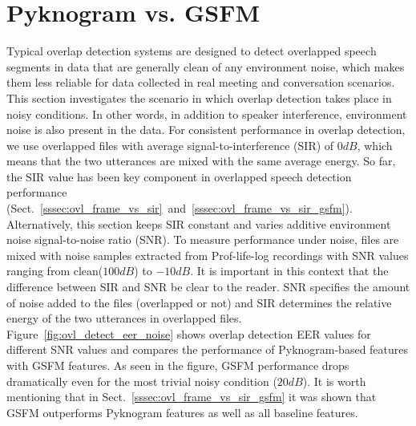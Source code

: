 {\section{Pyknogram vs. GSFM}
\label{sec:ch2_Pykno_vs_GSFM}
Typical overlap detection systems are designed to detect overlapped speech segments in data that are generally clean of any environment noise, which makes them less reliable for data collected in real meeting and conversation scenarios. 
This section investigates the scenario in which overlap detection takes place in noisy conditions. 
In other words, in addition to speaker interference, environment noise is also present in the data. 
For consistent performance in overlap detection, we use overlapped files with average signal-to-interference (SIR) of $0dB$, which means that the two utterances are mixed with the same average energy. 
So far, the SIR value has been key component in overlapped speech detection performance (Sect.~\ref{sssec:ovl_frame_vs_sir}~and~\ref{sssec:ovl_frame_vs_sir_gsfm}).
Alternatively, this section keeps SIR constant and varies additive environment noise signal-to-noise ratio (SNR).
To measure performance under noise, files are mixed with noise samples extracted from Prof-life-log\cite{ziaei2013prof} recordings with SNR values ranging from clean($100dB$) to $-10dB$. 
It is important in this context that the difference between SIR and SNR be clear to the reader. 
SNR specifies the amount of noise added to the files (overlapped or not) and SIR determines the relative energy of the two utterances in overlapped files. 
Figure~\ref{fig:ovl_detect_eer_noise} shows overlap detection EER values for different SNR values and compares the performance of Pyknogram-based features with GSFM features. 
As seen in the figure, GSFM performance drops dramatically even for the most trivial noisy condition ($20dB$). 
It is worth mentioning that in Sect.~\ref{sssec:ovl_frame_vs_sir_gsfm} it was shown that GSFM outperforms Pyknogram features as well as all baseline features. 

}
